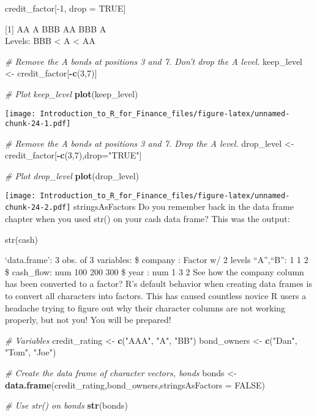 \documentclass[]{article}
\newenvironment{Shaded}{\begin{snugshade}}{\end{snugshade}}
\newcommand{\KeywordTok}[1]{\textcolor[rgb]{0.13,0.29,0.53}{\textbf{#1}}}
\newcommand{\DataTypeTok}[1]{\textcolor[rgb]{0.13,0.29,0.53}{#1}}
\newcommand{\DecValTok}[1]{\textcolor[rgb]{0.00,0.00,0.81}{#1}}
\newcommand{\StringTok}[1]{\textcolor[rgb]{0.31,0.60,0.02}{#1}}
\newcommand{\CommentTok}[1]{\textcolor[rgb]{0.56,0.35,0.01}{\textit{#1}}}
\newcommand{\OtherTok}[1]{\textcolor[rgb]{0.56,0.35,0.01}{#1}}
\newcommand{\OperatorTok}[1]{\textcolor[rgb]{0.81,0.36,0.00}{\textbf{#1}}}
\newcommand{\NormalTok}[1]{#1}
\begin{document}
credit\_factor{[}-1, drop = TRUE{]}

{[}1{]} AA A BBB AA BBB A\\
Levels: BBB \textless{} A \textless{} AA

\begin{Shaded}
\begin{Highlighting}[]
\CommentTok{# Remove the A bonds at positions 3 and 7. Don't drop the A level.}
\NormalTok{keep_level <-}\StringTok{ }\NormalTok{credit_factor[}\OperatorTok{-}\KeywordTok{c}\NormalTok{(}\DecValTok{3}\NormalTok{,}\DecValTok{7}\NormalTok{)]}

\CommentTok{# Plot keep_level}
\KeywordTok{plot}\NormalTok{(keep_level)}
\end{Highlighting}
\end{Shaded}

\texttt{[image: Introduction\_to\_R\_for\_Finance\_files/figure-latex/unnamed-chunk-24-1.pdf]}

\begin{Shaded}
\begin{Highlighting}[]
\CommentTok{# Remove the A bonds at positions 3 and 7. Drop the A level.}
\NormalTok{drop_level <-credit_factor[}\OperatorTok{-}\KeywordTok{c}\NormalTok{(}\DecValTok{3}\NormalTok{,}\DecValTok{7}\NormalTok{),drop=}\StringTok{"TRUE"}\NormalTok{]}

\CommentTok{# Plot drop_level}
\KeywordTok{plot}\NormalTok{(drop_level)}
\end{Highlighting}
\end{Shaded}

\texttt{[image: Introduction\_to\_R\_for\_Finance\_files/figure-latex/unnamed-chunk-24-2.pdf]}
stringsAsFactors Do you remember back in the data frame chapter when you
used str() on your cash data frame? This was the output:

str(cash)

`data.frame': 3 obs. of 3 variables: \$ company : Factor w/ 2 levels
``A'',``B'': 1 1 2 \$ cash\_flow: num 100 200 300 \$ year : num 1 3 2
See how the company column has been converted to a factor? R's default
behavior when creating data frames is to convert all characters into
factors. This has caused countless novice R users a headache trying to
figure out why their character columns are not working properly, but not
you! You will be prepared!

\begin{Shaded}
\begin{Highlighting}[]
\CommentTok{# Variables}
\NormalTok{credit_rating <-}\StringTok{ }\KeywordTok{c}\NormalTok{(}\StringTok{"AAA"}\NormalTok{, }\StringTok{"A"}\NormalTok{, }\StringTok{"BB"}\NormalTok{)}
\NormalTok{bond_owners <-}\StringTok{ }\KeywordTok{c}\NormalTok{(}\StringTok{"Dan"}\NormalTok{, }\StringTok{"Tom"}\NormalTok{, }\StringTok{"Joe"}\NormalTok{)}

\CommentTok{# Create the data frame of character vectors, bonds}
\NormalTok{bonds <-}\KeywordTok{data.frame}\NormalTok{(credit_rating,bond_owners,}\DataTypeTok{stringsAsFactors =} \OtherTok{FALSE}\NormalTok{)}


\CommentTok{# Use str() on bonds}
\KeywordTok{str}\NormalTok{(bonds)}
\end{Highlighting}
\end{Shaded}
\end{document}
